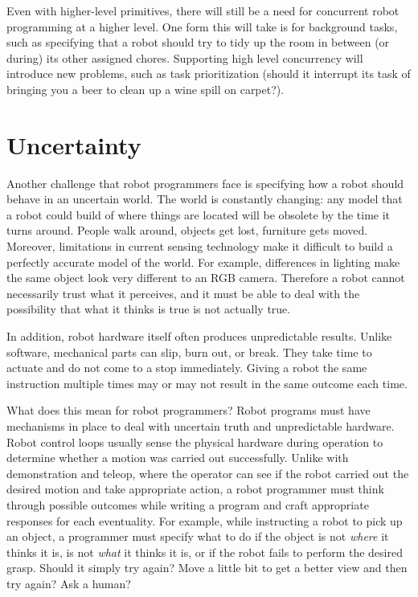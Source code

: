 \documentclass[11pt,twocolumn]{article}
\begin{document}
Even with higher-level primitives, there will still be a need for concurrent robot programming at a higher level. One form this will take is for background tasks, such as specifying that a robot should try to tidy up the room in between (or during) its other assigned chores. Supporting high level concurrency will introduce new problems, such as task prioritization (should it interrupt its task of bringing you a beer to clean up a wine spill on carpet?).

\section{Uncertainty}


Another challenge that robot programmers face is specifying how a robot should behave in an uncertain world. The world is constantly changing: any model that a robot could build of where things are located will be obsolete by the time it turns around. People walk around, objects get lost, furniture gets moved. Moreover, limitations in current sensing technology make it difficult to build a perfectly accurate model of the world. For example, differences in lighting make the same object look very different to an RGB camera. Therefore a robot cannot necessarily trust what it perceives, and it must be able to deal with the possibility that what it thinks is true is not actually true.

In addition, robot hardware itself often produces unpredictable results. Unlike software, mechanical parts can slip, burn out, or break. They take time to actuate and do not come to a stop immediately. Giving a robot the same instruction multiple times may or may not result in the same outcome each time.

What does this mean for robot programmers? Robot programs must have mechanisms in place to deal with uncertain truth and unpredictable hardware. Robot control loops usually sense the physical hardware during operation to determine whether a motion was carried out successfully. Unlike with demonstration and teleop, where the operator can see if the robot carried out the desired motion and take appropriate action, a robot programmer must think through possible outcomes while writing a program and craft appropriate responses for each eventuality. For example, while instructing a robot to pick up an object, a programmer must specify what to do if the object is not {\em where} it thinks it is, is not {\em what} it thinks it is, or if the robot fails to perform the desired grasp. Should it simply try again? Move a little bit to get a better view and then try again? Ask a human?
\end{document}
